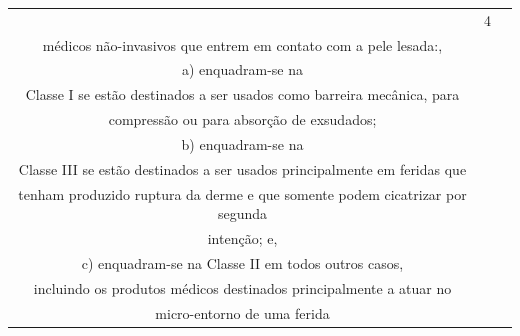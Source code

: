 {{\begin{longtable}{|c|c|l|}
                                  & 4              & \begin{tabular}[c]{@{}l@{}}Todos os produtos\\ médicos não-invasivos que entrem em contato com a pele lesada:,\\ a) enquadram-se na\\ Classe I se estão destinados a ser usados como barreira mecânica, para\\ compressão ou para absorção de exsudados;\\ b) enquadram-se na\\ Classe III se estão destinados a ser usados principalmente em feridas que\\ tenham produzido ruptura da derme e que somente podem cicatrizar por segunda\\ intenção; e,\\ c) enquadram-se na Classe II em todos outros casos,\\ incluindo os produtos médicos destinados principalmente a atuar no\\ micro-entorno de uma ferida\end{tabular}                                                                                                                                                                                                                                                                                                                                                                                                                                                                                                          \\ \hline

\end{longtable}}}
